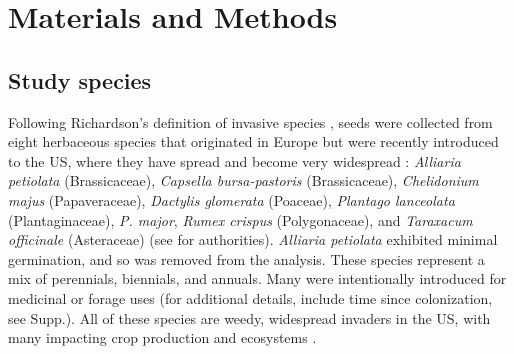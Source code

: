 \documentclass[11pt]{article}\usepackage[]{graphicx}\usepackage[]{color}
\begin{document}
	\section{Materials and Methods}
	\subsection{Study species}
	Following Richardson's definition of invasive species \parencite[][, see Supp. for details]{Richardson2000, Richardson2011}, seeds were collected from eight herbaceous species that originated in Europe but were recently introduced to the US, where they have spread and become very widespread  \parencite{Uva1997}:\textit{ Alliaria petiolata} (Brassicaceae), \textit{Capsella bursa-pastoris} (Brassicaceae), \textit{Chelidonium majus} (Papaveraceae), \textit{Dactylis glomerata} (Poaceae),  \textit{Plantago lanceolata} (Plantaginaceae), \textit{P.  major}, \textit{Rumex crispus} (Polygonaceae), and \textit{Taraxacum officinale} (Asteraceae) (see \textcite{Haines2011} for authorities). \textit{Alliaria petiolata} exhibited minimal germination, and so was removed from the analysis. These species represent a mix of perennials, biennials, and annuals. Many were intentionally introduced for medicinal or forage uses (for additional details, include time since colonization, see Supp.).  All of these species are weedy, widespread invaders in the US, with many impacting crop production and ecosystems \parencite[e.g.,][]{Froese2003,Wolfe2008}. 
\end{document}
